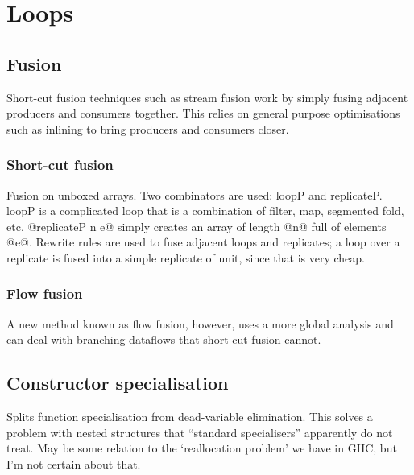 \section{Loops}

\subsection{Fusion}
Short-cut fusion techniques such as stream fusion \cite{coutts2007streamfusion}
work by simply fusing adjacent producers and consumers together.
This relies on general purpose optimisations such as inlining to bring producers and consumers closer. 

\subsubsection{Short-cut fusion}


Fusion on unboxed arrays. Two combinators are used: loopP and replicateP.
loopP is a complicated loop that is a combination of filter, map, segmented fold, etc.
@replicateP n e@ simply creates an array of length @n@ full of elements @e@.
Rewrite rules are used to fuse adjacent loops and replicates; a loop over a replicate is
fused into a simple replicate of unit, since that is very cheap.


\subsubsection{Flow fusion}

A new method known as flow fusion\cite{lippmeier2013flow}, however, uses a more global analysis
and can deal with branching dataflows that short-cut fusion cannot.

\subsection{Constructor specialisation}

Splits function specialisation from dead-variable elimination.
This solves a problem with nested structures that ``standard specialisers'' apparently do not treat.
May be some relation to the `reallocation problem' we have in GHC, but I'm not certain about that.

